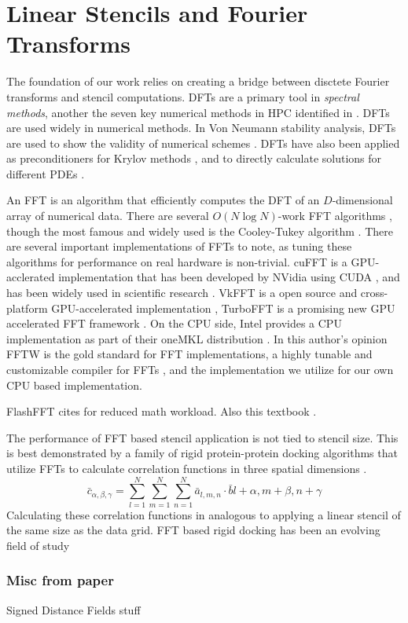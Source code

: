 \section{Linear Stencils and Fourier Transforms}

The foundation of our work relies on creating a bridge between
disctete Fourier transforms and stencil computations.
DFTs are a primary tool in \textit{spectral methods},
another the seven key numerical methods in HPC identified in \cite{Asanovic2006Landscape}. 
DFTs are used widely in numerical methods.
In Von Neumann stability analysis, 
DFTs are used to show the validity of numerical schemes \cite{Pereda2001Von, Wesseling1996Von}.
DFTs have also been applied as preconditioners for Krylov methods
\cite{Chan1993FFT, Chan1984fd, Erlangga2006, Gmeiner2013},
and to directly calculate solutions for different PDEs 
\cite{Hockney1965FFT, Schumann1988FFT, Mugler1988FFT}.


An FFT is an algorithm that efficiently computes the DFT 
of an $D$-dimensional array of numerical data.
There are several $O(N \log N)$-work FFT algorithms 
\cite{Winograd1978DFT, Good1958DFT, Brunn1978DFT},
though the most famous and widely used is the Cooley-Tukey algorithm 
\cite{Cooley1965FFT}.
There are several important implementations of FFTs to note, 
as tuning these algorithms for performance on real hardware is non-trivial.
cuFFT is a GPU-acclerated implementation 
that has been developed by NVidia using CUDA \cite{CuFFTDocs}, 
and has been widely used in scientific research \cite{Prigarin2019FFT, Narebski2013FFT}.
VkFFT is a open source and cross-platform GPU-accelerated implementation \cite{Tolmachev2023FFT}, 
TurboFFT is a promising new GPU accelerated FFT framework \cite{Wu2025TurboFFT}.
On the CPU side,
Intel provides a CPU implementation as part of their oneMKL distribution \cite{MKLFFT}.
In this author's opinion FFTW is the gold standard for FFT implementations, a highly tunable and customizable compiler for FFTs \cite{Frigo2005FFTW3}, and the implementation we utilize for our own CPU based implementation.





FlashFFT cites \cite{Li1986FFT} for reduced math workload.
Also this textbook \cite{Krishna2017digital}.


The performance of FFT based stencil application is not tied to stencil size.
This is best demonstrated by a family of rigid protein-protein docking algorithms 
that utilize FFTs to calculate correlation functions in three spatial dimensions \cite{Katzir1992Protein}.
$$
\bar{c}_{\alpha, \beta, \gamma} = \sum_{l = 1}^N \sum_{m = 1}^N \sum_{n = 1}^N \bar{a}_{l, m,n} \cdot \bar{b}{l + \alpha, m+ \beta, n + \gamma}
$$
Calculating these correlation functions in analogous to applying a linear stencil of the same size as the data grid.
FFT based rigid docking has been an evolving field of study \cite{Gabb1997Protein, Castrillon2005Protein, Bajaj2011Protein}


\subsubsection{Misc from paper}

Signed Distance Fields stuff \cite{Baerentzen2005SDF, Chang2008SDF, Li2018SDF, Jafferson2021SDF}

